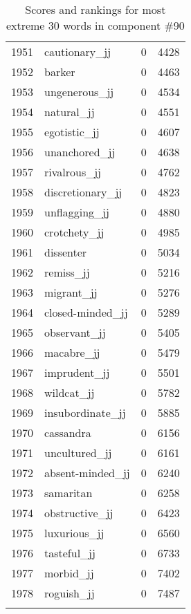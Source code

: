 \begin{longtable}[!htbp]{| rlr@{.}l |}
    1951 & cautionary\_jj & 0 & 4428 \\
    1952 & barker & 0 & 4463 \\
    1953 & ungenerous\_jj & 0 & 4534 \\
    1954 & natural\_jj & 0 & 4551 \\
    1955 & egotistic\_jj & 0 & 4607 \\
    1956 & unanchored\_jj & 0 & 4638 \\
    1957 & rivalrous\_jj & 0 & 4762 \\
    1958 & discretionary\_jj & 0 & 4823 \\
    1959 & unflagging\_jj & 0 & 4880 \\
    1960 & crotchety\_jj & 0 & 4985 \\
    1961 & dissenter & 0 & 5034 \\
    1962 & remiss\_jj & 0 & 5216 \\
    1963 & migrant\_jj & 0 & 5276 \\
    1964 & closed-minded\_jj & 0 & 5289 \\
    1965 & observant\_jj & 0 & 5405 \\
    1966 & macabre\_jj & 0 & 5479 \\
    1967 & imprudent\_jj & 0 & 5501 \\
    1968 & wildcat\_jj & 0 & 5782 \\
    1969 & insubordinate\_jj & 0 & 5885 \\
    1970 & cassandra & 0 & 6156 \\
    1971 & uncultured\_jj & 0 & 6161 \\
    1972 & absent-minded\_jj & 0 & 6240 \\
    1973 & samaritan & 0 & 6258 \\
    1974 & obstructive\_jj & 0 & 6423 \\
    1975 & luxurious\_jj & 0 & 6560 \\
    1976 & tasteful\_jj & 0 & 6733 \\
    1977 & morbid\_jj & 0 & 7402 \\
    1978 & roguish\_jj & 0 & 7487 \\
    \hline
    \caption{Scores and rankings for most extreme 30 words in component \#90} \\
\end{longtable}
